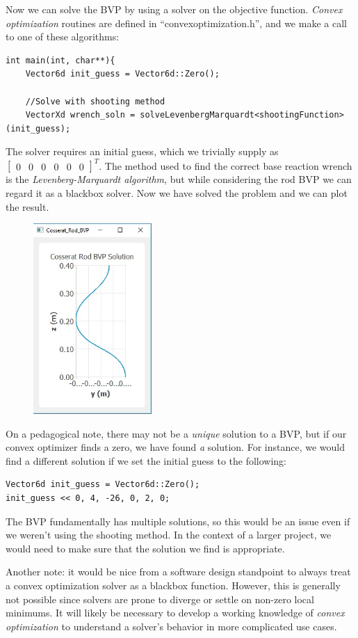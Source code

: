 \documentclass[12pt]{article}
\begin{document}
Now we can solve the BVP by using a solver on the objective function. \emph{Convex optimization} routines are defined in ``convexoptimization.h'', and we make a call to one of these algorithms:
\begin{lstlisting}
int main(int, char**){
    Vector6d init_guess = Vector6d::Zero();

    //Solve with shooting method
    VectorXd wrench_soln = solveLevenbergMarquardt<shootingFunction>(init_guess);
\end{lstlisting}
The solver requires an initial guess, which we trivially supply as $\begin{bmatrix} 0 & 0 & 0 & 0 & 0 & 0\end{bmatrix}^T$. The method used to find the correct base reaction wrench is the \emph{Levenberg-Marquardt algorithm}, but while considering the rod BVP we can regard it as a blackbox solver. Now we have solved the problem and we can plot the result.
\begin{figure}[h]
	\centering
		\includegraphics[width=0.4\textwidth]{fig/SolutionPlot.jpg}
	\label{fig:SolutionPlot}
\end{figure}

On a pedagogical note, there may not be a \emph{unique} solution to a BVP, but if our convex optimizer finds a zero, we have found \emph{a} solution. For instance, we would find a different solution if we set the initial guess to the following:
\begin{lstlisting}
Vector6d init_guess = Vector6d::Zero();
init_guess << 0, 4, -26, 0, 2, 0;
\end{lstlisting}
The BVP fundamentally has multiple solutions, so this would be an issue even if we weren't using the shooting method. In the context of a larger project, we would need to make sure that the solution we find is appropriate.

Another note: it would be nice from a software design standpoint to always treat a convex optimization solver as a blackbox function. However, this is generally not possible since solvers are prone to diverge or settle on non-zero local minimums. It will likely be necessary to develop a working knowledge of \emph{convex optimization} to understand a solver's behavior in more complicated use cases.
\end{document}
